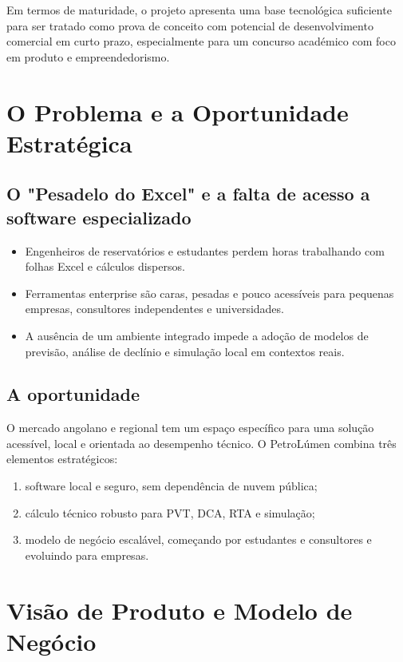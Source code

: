 \documentclass[11pt,a4paper]{article}
\begin{document}
Em termos de maturidade, o projeto apresenta uma base tecnológica suficiente para ser tratado como prova de conceito com potencial de desenvolvimento comercial em curto prazo, especialmente para um concurso académico com foco em produto e empreendedorismo.

\section{O Problema e a Oportunidade Estratégica}
\subsection{O "Pesadelo do Excel" e a falta de acesso a software especializado}
\begin{itemize}
    \item Engenheiros de reservatórios e estudantes perdem horas trabalhando com folhas Excel e cálculos dispersos.
    \item Ferramentas enterprise são caras, pesadas e pouco acessíveis para pequenas empresas, consultores independentes e universidades.
    \item A ausência de um ambiente integrado impede a adoção de modelos de previsão, análise de declínio e simulação local em contextos reais.
\end{itemize}

\subsection{A oportunidade}
O mercado angolano e regional tem um espaço específico para uma solução acessível, local e orientada ao desempenho técnico. O PetroLúmen combina três elementos estratégicos: 
\begin{enumerate}
    \item software local e seguro, sem dependência de nuvem pública;
    \item cálculo técnico robusto para PVT, DCA, RTA e simulação;
    \item modelo de negócio escalável, começando por estudantes e consultores e evoluindo para empresas.
\end{enumerate}

\section{Visão de Produto e Modelo de Negócio}
\end{document}

